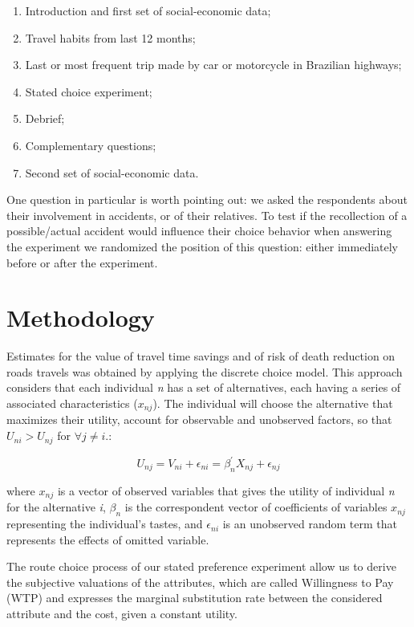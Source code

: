 \documentclass[]{elsarticle} %
\begin{document}
\begin{enumerate}
\def\labelenumi{(\arabic{enumi})}
\item
  Introduction and first set of social-economic data;
\item
  Travel habits from last 12 months;
\item
  Last or most frequent trip made by car or motorcycle in Brazilian
  highways;
\item
  Stated choice experiment;
\item
  Debrief;
\item
  Complementary questions;
\item
  Second set of social-economic data.
\end{enumerate}

One question in particular is worth pointing out: we asked the
respondents about their involvement in accidents, or of their relatives.
To test if the recollection of a possible/actual accident would
influence their choice behavior when answering the experiment we
randomized the position of this question: either immediately before or
after the experiment.

\hypertarget{methodology}{%
\section{Methodology}\label{methodology}}

Estimates for the value of travel time savings and of risk of death
reduction on roads travels was obtained by applying the discrete choice
model. This approach considers that each individual \emph{n} has a set
of alternatives, each having a series of associated characteristics
(\(x_{nj}\)). The individual will choose the alternative that maximizes
their utility, account for observable and unobserved factors, so that
\(U_{ni} > U_{nj}\) for \(\forall j\neq i\).:

\[
U_{nj} = V_{ni} + \epsilon_{ni} = \beta^{'}_{n} X_{nj} + \epsilon_{nj}
\]

where \(x_{nj}\) is a vector of observed variables that gives the
utility of individual \emph{n} for the alternative \emph{i}, \(\beta_n\)
is the correspondent vector of coefficients of variables \(x_{nj}\)
representing the individual's tastes, and \(\epsilon_{ni}\) is an
unobserved random term that represents the effects of omitted variable.

The route choice process of our stated preference experiment allow us to
derive the subjective valuations of the attributes, which are called
Willingness to Pay (WTP) and expresses the marginal substitution rate
between the considered attribute and the cost, given a constant utility.
\end{document}
